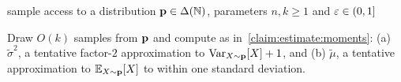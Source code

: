 \begin{algorithm}[ht]
  \begin{algorithmic}[1]
    \Require sample access to a distribution $\mathbf{p}\in\Delta\!\left(\mathbb{N}\right)$, parameters $n,k\geq 1$ and $\varepsilon\in(0,1]$
    
    \State{}
    
    \State\label{algo:step:estimates:mu:sigma} Draw $O(k)$ samples from $\mathbf{p}$ and compute as in~\cref{claim:estimate:moments}: (a) $\widetilde{\sigma}^2$, a tentative factor-$2$ approximation to $\operatorname{Var}_{X \sim \mathbf{p}}[X]+1$,
and (b) $\widetilde{\mu}$, a tentative approximation to $\mathbb{E}_{X \sim \mathbf{p}}[X]$ to within one standard deviation.
     \label{algo:step:check:stdev}
        \State \Return \reject    {}
    \EndIf
    

\end{algorithmic}
\end{algorithm}

